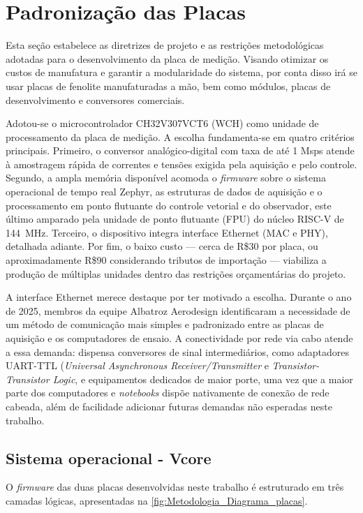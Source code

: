 \section{Padronização das Placas}
\label{sec:padronizacao_placas}
Esta seção estabelece as diretrizes de projeto e as restrições metodológicas adotadas para o desenvolvimento da placa de medição. Visando otimizar os custos de manufatura e garantir a modularidade do sistema, por conta disso irá se usar placas de fenolite manufaturadas a mão, bem como módulos, placas de desenvolvimento e conversores comerciais.

Adotou-se o microcontrolador CH32V307VCT6 (WCH) como unidade de processamento
da placa de medição. A escolha fundamenta-se em quatro critérios principais.
Primeiro, o conversor analógico-digital com taxa de até 1 Msps
atende à amostragem rápida de correntes e tensões exigida pela aquisição e pelo
controle. Segundo, a ampla memória disponível acomoda o \textit{firmware} sobre
o sistema operacional de tempo real Zephyr, as estruturas de dados de aquisição
e o processamento em ponto flutuante do controle vetorial e do observador, este
último amparado pela unidade de ponto flutuante (FPU) do núcleo RISC-V de
\SI{144}{\mega\hertz}. Terceiro, o dispositivo integra interface Ethernet
(MAC e PHY), detalhada adiante. Por fim, o baixo custo — cerca de
R\$30 por placa, ou aproximadamente R\$90 considerando
tributos de importação — viabiliza a produção de múltiplas unidades dentro das
restrições orçamentárias do projeto.

A interface Ethernet merece destaque por ter motivado a escolha. Durante o ano
de 2025, membros da equipe Albatroz Aerodesign identificaram a necessidade de um
método de comunicação mais simples e padronizado entre as placas de aquisição e
os computadores de ensaio. A conectividade por rede via cabo atende a essa
demanda: dispensa conversores de sinal intermediários, como adaptadores
UART-TTL (\textit{Universal Asynchronous Receiver/Transmitter} e \textit{Transistor-Transistor Logic}, e equipamentos dedicados de maior porte, uma vez que a maior parte dos
computadores e \textit{notebooks} dispõe nativamente de conexão de rede cabeada, além de facilidade adicionar futuras demandas não esperadas neste trabalho.

\subsection{Sistema operacional - Vcore}

O \textit{firmware} das duas placas desenvolvidas neste trabalho é estruturado
em três camadas lógicas, apresentadas na \autoref{fig:Metodologia_Diagrama_placas}.

